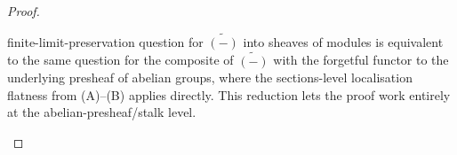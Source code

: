 \begin{proof}
\begin{itemize}
      finite-limit-preservation question for \(\widetilde{(-)}\) into sheaves of modules is
      equivalent to the same question for the composite of \(\widetilde{(-)}\) with the
      forgetful functor to the underlying presheaf of abelian groups, where the
      sections-level localisation flatness from (A)–(B) applies directly. This reduction
      lets the proof work entirely at the abelian-presheaf/stalk level.
  \end{itemize}
\end{proof}

